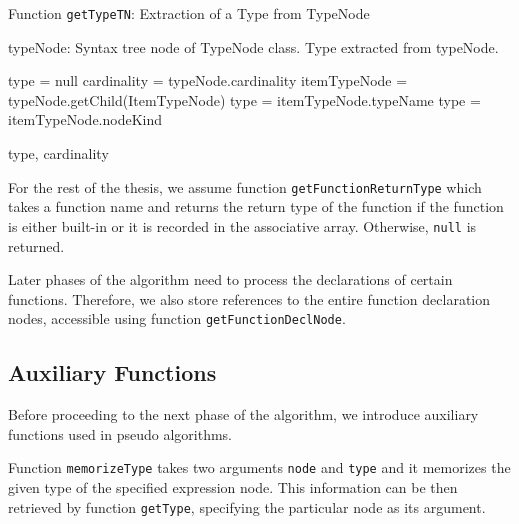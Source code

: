 \begin{algorithm}
\caption{Function \texttt{getTypeTN}: Extraction of a Type from TypeNode}
\label{ALG_extraction_of_a_type_from_typenode}
\begin{algorithmic}[1]
\REQUIRE typeNode: Syntax tree node of TypeNode class.
\ENSURE Type extracted from typeNode.

\STATE type = null
\STATE cardinality = typeNode.cardinality
\STATE itemTypeNode = typeNode.getChild(ItemTypeNode)
    \STATE type = itemTypeNode.typeName
    \STATE type = itemTypeNode.nodeKind
\ENDIF

\RETURN type, cardinality
\end{algorithmic}
\end{algorithm}


For the rest of the thesis, we assume function \texttt{getFunctionReturnType} which takes a function name and returns the return type of the function if the function is either built-in or it is recorded in the associative array. Otherwise, \texttt{null} is returned.

Later phases of the algorithm need to process the declarations of certain functions. Therefore, we also store references to the entire function declaration nodes, accessible using function \texttt{getFunctionDeclNode}.

\subsection{Auxiliary Functions}
Before proceeding to the next phase of the algorithm, we introduce auxiliary functions used in pseudo algorithms.

Function \texttt{memorizeType} takes two arguments \texttt{node} and \texttt{type} and it memorizes the given type of the specified expression node. This information can be then retrieved by function \texttt{getType}, specifying the particular node as its argument.

